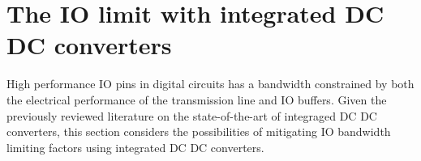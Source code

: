 \documentclass[letterpaper,twocolumn,10pt]{article}
\begin{document}

\section{The IO limit with integrated DC DC converters}

High performance IO pins in digital circuits has a bandwidth constrained by both the electrical performance of the transmission line and IO buffers. Given the previously reviewed literature on the state-of-the-art of integraged DC DC converters, this section considers the possibilities of mitigating IO bandwidth limiting factors using integrated DC DC converters.
\end{document}
